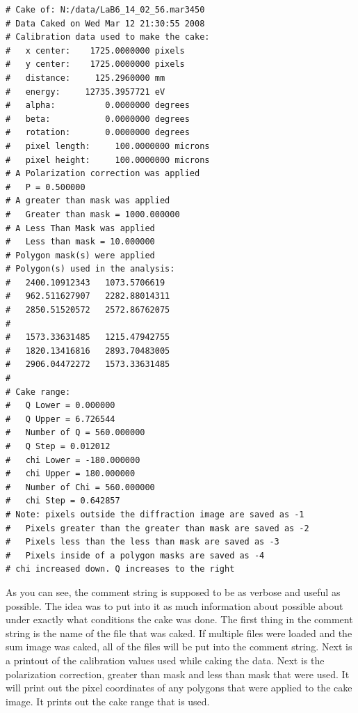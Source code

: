 \begin{lstlisting}[caption={'Draw the $Q$ Lines on the Display'}]
# Cake of: N:/data/LaB6_14_02_56.mar3450 
# Data Caked on Wed Mar 12 21:30:55 2008
# Calibration data used to make the cake:
#   x center:    1725.0000000 pixels
#   y center:    1725.0000000 pixels
#   distance:     125.2960000 mm
#   energy:     12735.3957721 eV
#   alpha:          0.0000000 degrees
#   beta:           0.0000000 degrees
#   rotation:       0.0000000 degrees
#   pixel length:     100.0000000 microns
#   pixel height:     100.0000000 microns
# A Polarization correction was applied
#   P = 0.500000
# A greater than mask was applied
#   Greater than mask = 1000.000000
# A Less Than Mask was applied
#   Less than mask = 10.000000
# Polygon mask(s) were applied
# Polygon(s) used in the analysis:
#   2400.10912343	1073.5706619
#   962.511627907	2282.88014311
#   2850.51520572	2572.86762075
#
#   1573.33631485	1215.47942755
#   1820.13416816	2893.70483005
#   2906.04472272	1573.33631485
#
# Cake range:
#   Q Lower = 0.000000
#   Q Upper = 6.726544
#   Number of Q = 560.000000
#   Q Step = 0.012012
#   chi Lower = -180.000000
#   chi Upper = 180.000000
#   Number of Chi = 560.000000
#   chi Step = 0.642857
# Note: pixels outside the diffraction image are saved as -1
#   Pixels greater than the greater than mask are saved as -2
#   Pixels less than the less than mask are saved as -3
#   Pixels inside of a polygon masks are saved as -4
# chi increased down. Q increases to the right
\end{lstlisting}
As you can see, the comment string is supposed to be as verbose
and useful as possible. The idea was to put into it as much
information about possible about under exactly what conditions
the cake was done. The first thing in the comment string is
the name of the file that was caked. If multiple files were loaded
and the sum image was caked, all of the files will be put into
the comment string. Next is a printout of the calibration values
used while caking the data. Next is the polarization correction,
greater than mask and less than mask that were used. It will print
out the pixel coordinates of any polygons that were applied to
the cake image. It prints out the cake range that is used.

